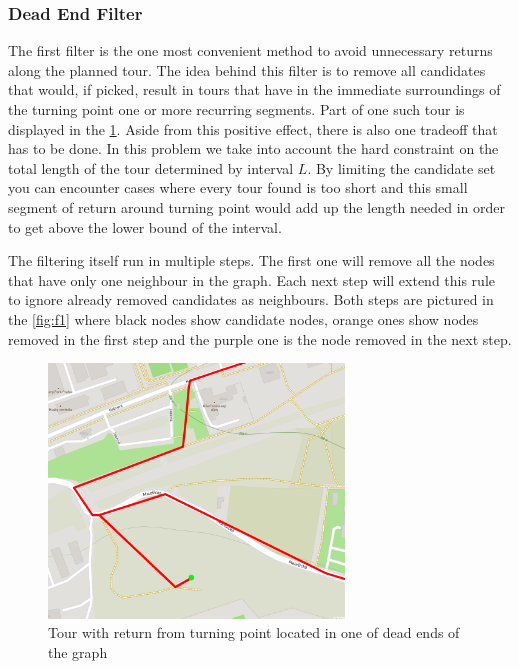 \documentclass{ctuthesis}
\begin{document}
\subsubsection{Dead End Filter}
The first filter is the one most convenient method to avoid unnecessary returns along the planned tour. The idea behind this filter is to remove all candidates that would, if picked, result in tours that have in the immediate surroundings of the turning point one or more recurring segments. Part of one such tour is displayed in the \ref{fig:return}. Aside from this positive effect, there is also one tradeoff that has to be done. In this problem we take into account the hard constraint on the total length of the tour determined by interval \(L\). By limiting the candidate set you can encounter cases where every tour found is too short and this small segment of return around turning point would add up the length needed in order to get above the lower bound of the interval. \par
The filtering itself run in multiple steps. The first one will remove all the nodes that have only one neighbour in the graph. Each next step will extend this rule to ignore already removed candidates as neighbours. Both steps are pictured in the \ref{fig:f1} where black nodes show candidate nodes, orange ones show nodes removed in the first step and the purple one is the node removed in the next step. 

\begin{figure}
	\includegraphics[width=0.7\textwidth]{return.png}
	\caption{Tour with return from turning point located in one of dead ends of the graph}
	\label{fig:return}
\end{figure}
\end{document}
